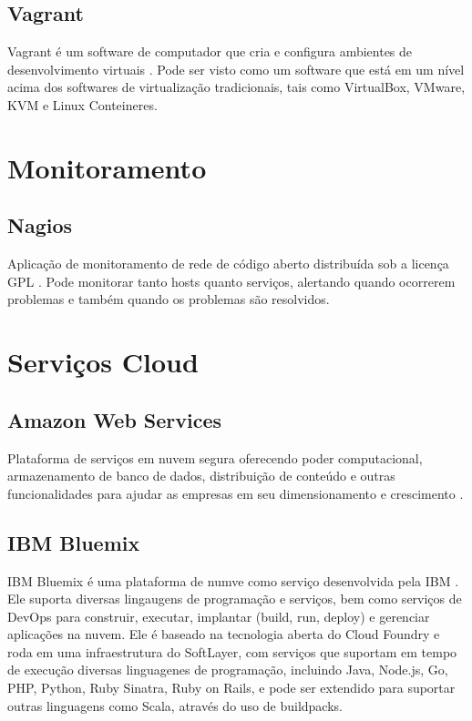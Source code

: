 	\subsection{Vagrant} Vagrant é um software de computador que cria e
	configura ambientes de desenvolvimento virtuais \cite{hashimoto2013vagrant}. Pode ser visto como
	um software que está em um nível acima dos softwares de virtualização
	tradicionais, tais como VirtualBox, VMware, KVM e Linux Conteineres.

    \section{Monitoramento}

	\subsection{Nagios} Aplicação de monitoramento de rede de código
	aberto distribuída sob a licença GPL \cite{barth2008nagios}. Pode monitorar tanto hosts
	quanto serviços, alertando quando ocorrerem problemas e também
	quando os problemas são resolvidos.

\section{Serviços Cloud}

  	\subsection{Amazon Web Services} Plataforma de serviços em nuvem
  	segura oferecendo poder computacional, armazenamento de banco de
  	dados, distribuição de conteúdo e outras funcionalidades para
  	ajudar as empresas em seu dimensionamento e crescimento \cite{cloud2011amazon}.

    \subsection{IBM Bluemix}
    IBM Bluemix é uma plataforma de numve como serviço desenvolvida pela 
    IBM \cite{reinitz2014ibm}. Ele suporta diversas lingaugens de programação 
    e serviços, bem como serviços de DevOps para construir, executar, implantar 
    (build, run, deploy) e gerenciar aplicações na nuvem. Ele é baseado na 
    tecnologia aberta do Cloud Foundry e roda em uma infraestrutura do 
    SoftLayer, com serviços que suportam em tempo de execução diversas 
    linguagenes de programação, incluindo Java, Node.js, Go, PHP, Python, 
    Ruby Sinatra, Ruby on Rails, e pode ser extendido para suportar outras 
    linguagens como Scala, através do uso de buildpacks.


